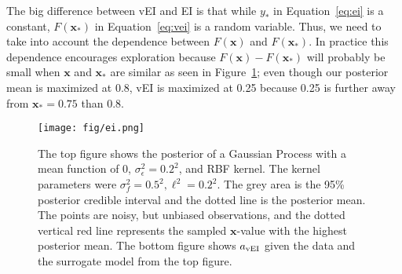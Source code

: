 The big difference between vEI and EI is that while $y_*$ in Equation~\ref{eq:ei} is a constant, $F(\mathbf{x}_*)$ in Equation~\ref{eq:vei} is a random variable.
Thus, we need to take into account the dependence between $F(\mathbf{x})$ and $F(\mathbf{x}_*)$.
In practice this dependence encourages exploration because $F(\mathbf{x}) - F(\mathbf{x}_*)$ will probably be small when $\mathbf{x}$ and $\mathbf{x}_*$ are similar as seen in Figure~\ref{fig:ei};
even though our posterior mean is maximized at 0.8, vEI is maximized at 0.25 because 0.25 is further away from $\mathbf{x}_* = 0.75$ than 0.8.

\begin{figure}[t]
    \centering
    \texttt{[image: fig/ei.png]}
    \caption{
        The top figure shows the posterior of a Gaussian Process with a mean function of 0,
        $\sigma_{\epsilon}^2 = 0.2^2$, and RBF kernel.
        The kernel parameters were $\sigma_f^2 = 0.5^2, \ell^2 = 0.2^2$.
        The grey area is the 95\% posterior credible interval and the dotted line is the posterior mean.
        The points are noisy, but unbiased observations, and the dotted vertical red line represents the sampled $\mathbf{x}$-value with the highest posterior mean.
        The bottom figure shows $a_{\mathrm{vEI}}$ given the data and the surrogate model from the top figure.
    }
    \label{fig:ei}

\end{figure}

